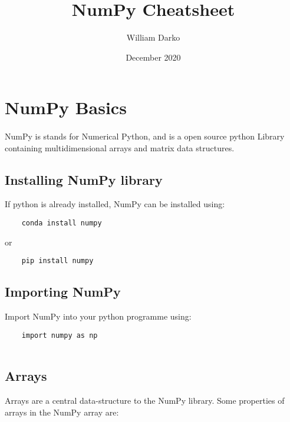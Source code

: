 \documentclass[12pt, a4paper]{article}
\title{NumPy Cheatsheet}
\author{William Darko}
\date{December 2020}
\begin{document}
\maketitle
\newpage

\tableofcontents

\newpage

\section{NumPy Basics}
\paragraph*{}
NumPy is stands for Numerical Python, and is a open source python Library containing multidimensional arrays and matrix data structures.

\subsection{Installing NumPy library}

If python is already installed, NumPy can be installed using:
\newline

\begin{lstlisting}
    conda install numpy
\end{lstlisting}

or

\begin{lstlisting}
    pip install numpy
\end{lstlisting}


\subsection{Importing NumPy}

Import NumPy into your python programme using:
\newline

\begin{lstlisting}
    import numpy as np
    
\end{lstlisting}


\subsection{Arrays}
Arrays are a central data-structure to the NumPy library. Some properties of arrays in the NumPy array are:
\end{document}

